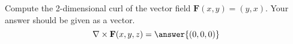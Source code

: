 \begin{problem}
Compute the 2-dimensional curl of the vector field $\mathbf{F}(x,y) = (y,x)$. Your answer should be given as a vector.
\[
\nabla\times\mathbf{F}(x,y,z) = \answer{(0,0,0)}
\]
\end{problem}